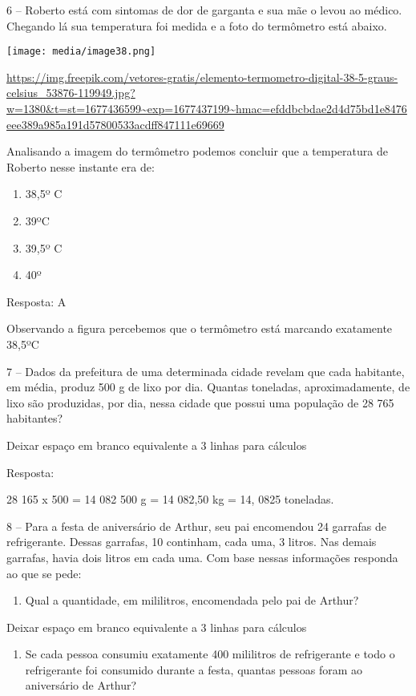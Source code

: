 6 -- Roberto está com sintomas de dor de garganta e sua mãe o levou ao
médico. Chegando lá sua temperatura foi medida e a foto do termômetro
está abaixo.

\texttt{[image: media/image38.png]}

\url{https://img.freepik.com/vetores-gratis/elemento-termometro-digital-38-5-graus-celsius_53876-119949.jpg?w=1380\&t=st=1677436599~exp=1677437199~hmac=efddbcbdae2d4d75bd1e8476eee389a985a191d57800533acdff847111e69669}

Analisando a imagem do termômetro podemos concluir que a temperatura de
Roberto nesse instante era de:

\begin{enumerate}
\def\labelenumi{\alph{enumi})}
\item
  38,5º C
\item
  39ºC
\item
  39,5º C
\item
  40º
\end{enumerate}

Resposta: A

Observando a figura percebemos que o termômetro está marcando exatamente
38,5ºC

7 -- Dados da prefeitura de uma determinada cidade revelam que cada
habitante, em média, produz 500 g de lixo por dia. Quantas toneladas,
aproximadamente, de lixo são produzidas, por dia, nessa cidade que
possui uma população de 28 765 habitantes?

Deixar espaço em branco equivalente a 3 linhas para cálculos

Resposta:

28 165 x 500 = 14 082 500 g = 14 082,50 kg = 14, 0825 toneladas.

8 -- Para a festa de aniversário de Arthur, seu pai encomendou 24
garrafas de refrigerante. Dessas garrafas, 10 continham, cada uma, 3
litros. Nas demais garrafas, havia dois litros em cada uma. Com base
nessas informações responda ao que se pede:

\begin{enumerate}
\def\labelenumi{\alph{enumi})}
\item
  Qual a quantidade, em mililitros, encomendada pelo pai de Arthur?
\end{enumerate}

Deixar espaço em branco equivalente a 3 linhas para cálculos

\begin{enumerate}
\def\labelenumi{\alph{enumi})}
\item
  Se cada pessoa consumiu exatamente 400 mililitros de refrigerante e
  todo o refrigerante foi consumido durante a festa, quantas pessoas
  foram ao aniversário de Arthur?
\end{enumerate}

